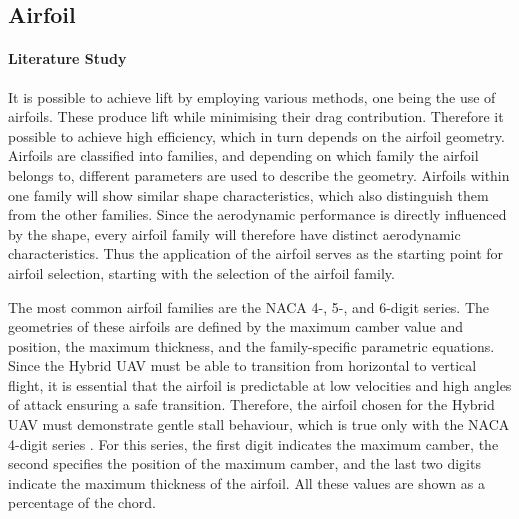 
\subsection*{Airfoil}

\paragraph{Literature Study} It is possible to achieve lift by employing various methods, one being the use of airfoils. These produce lift while minimising their drag contribution. Therefore it possible to achieve high efficiency, which in turn depends on the airfoil geometry. Airfoils are classified into families, and depending on which family the airfoil belongs to, different parameters are used to describe the geometry. Airfoils within one family will show similar shape characteristics, which also distinguish them from the other families. Since the aerodynamic performance is directly influenced by the shape, every airfoil family will therefore have distinct aerodynamic characteristics. Thus the application of the airfoil serves as the starting point for airfoil selection, starting with the selection of the airfoil family.

The most common airfoil families are the NACA 4-, 5-, and 6-digit series. The geometries of these airfoils are defined by the maximum camber value and position, the maximum thickness, and the family-specific parametric equations. Since the Hybrid UAV must be able to transition from horizontal to vertical flight, it is essential that the airfoil is predictable at low velocities and high angles of attack ensuring a safe transition. Therefore, the airfoil chosen for the Hybrid UAV must demonstrate gentle stall behaviour, which is true only with the NACA 4-digit series \cite{naca_series}. For this series, the first digit indicates the maximum camber, the second specifies the position of the maximum camber, and the last two digits indicate the maximum thickness of the airfoil. All these values are shown as a percentage of the chord.

